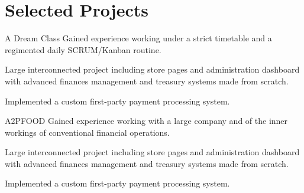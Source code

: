 \section{Selected Projects}

\begin{experience}{A Dream Class}{
}
Gained experience working under a strict timetable and a regimented daily SCRUM/Kanban routine.

\begin{contribs}
	\item{Large interconnected project including store pages and administration dashboard with advanced finances management and treasury systems made from scratch.}
	\item{Implemented a custom first-party payment processing system.}
\end{contribs}
\end{experience}

\begin{experience}{A2PFOOD}{
}
Gained experience working with a large company and of the inner workings of conventional financial operations.

\begin{contribs}
	\item{Large interconnected project including store pages and administration dashboard with advanced finances management and treasury systems made from scratch.}
	\item{Implemented a custom first-party payment processing system.}
\end{contribs}
\end{experience}
